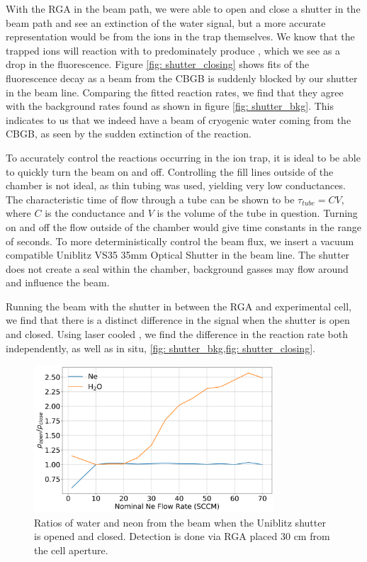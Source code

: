 With the RGA in the beam path, we were able to open and close a shutter in the beam path and see an extinction of the water signal, but a more accurate representation would be from the ions in the trap themselves. We know that the trapped  ions will reaction with  to predominately produce , which we see as a drop in the fluorescence. Figure \ref{fig: shutter_closing} shows fits of the fluorescence decay as a beam from the CBGB is suddenly blocked by our shutter in the beam line. Comparing the fitted reaction rates, we find that they agree with the background rates found as shown in figure \ref{fig: shutter_bkg}. This indicates to us that we indeed have a beam of cryogenic water coming from the CBGB, as seen by the sudden extinction of the  reaction.

To accurately control the reactions occurring in the ion trap, it is ideal to be able to quickly turn the beam on and off. Controlling the fill lines outside of the chamber is not ideal, as thin tubing was used, yielding very low conductances. The characteristic time of flow through a tube can be shown to be $\tau_{tube} = C V$, where $C$ is the conductance and $V$ is the volume of the tube in question. Turning on and off the flow outside of the chamber would give time constants in the range of seconds. To more deterministically control the beam flux, we insert a vacuum compatible Uniblitz VS35 35mm Optical Shutter in the beam line. The shutter does not create a seal within the chamber, background gasses may flow around and influence the beam.

Running the beam with the shutter in between the RGA and experimental cell, we find that there is a distinct difference in the  signal when the shutter is open and closed. Using laser cooled , we find the difference in the reaction rate both independently, as well as in situ, \cref{fig: shutter_bkg,fig: shutter_closing}.

\begin{figure}[H]
	\centering
	\includegraphics[width=0.8\textwidth]{images/CBGB_RGA_contrast.png}
	\caption{Ratios of water and neon from the beam when the Uniblitz shutter is opened and closed. Detection is done via RGA placed 30 cm from the cell aperture.}
	\label{fig: RGA contrast}
\end{figure}

